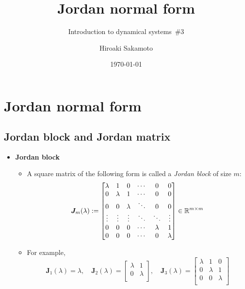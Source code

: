\documentclass[12pt,a4paper]{article}
\title{Jordan normal form}
\subtitle{Introduction to dynamical systems~\#3}
\author{Hiroaki Sakamoto}
\date{\today}
\begin{document}
\maketitle
\tableofcontents

\section{Jordan normal form}

\subsection{Jordan block and Jordan matrix}

\begin{itemize}

\item \textbf{Jordan block}
  \begin{itemize}
  \item A square matrix of the following form is called a \emph{Jordan block} of size $m$:
    \begin{equation}\nonumber%
      \bm{J}_{m}(\lambda) :=
      \begin{bmatrix}
        \lambda & 1 & 0 & \cdots & 0 & 0 \\
        0 & \lambda & 1 & \cdots & 0 & 0 \\
        0 & 0 & \lambda & \ddots & 0 & 0 \\
        \vdots & \vdots & \vdots & \ddots & \ddots & \vdots \\
        0 & 0 & 0 & \cdots & \lambda & 1 \\
        0 & 0 & 0  & \cdots & 0 &  \lambda \\
      \end{bmatrix} \in \R^{m\times m}
    \end{equation}
    
  \item For example,
    \begin{equation}\nonumber%
      \bm{J}_{1}(\lambda) = \lambda,
      \quad
      \bm{J}_{2}(\lambda) =
      \begin{bmatrix}
        \lambda & 1 \\
        0 & \lambda \\
      \end{bmatrix},
      \quad
      \bm{J}_{3}(\lambda) =
      \begin{bmatrix}
        \lambda & 1 & 0 \\
        0 & \lambda & 1 \\
        0 & 0 & \lambda \\
      \end{bmatrix}
    \end{equation}
  \end{itemize}


\end{itemize}
\end{document}
